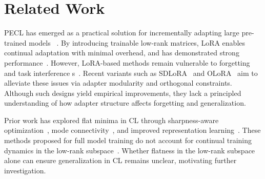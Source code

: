 \documentclass[10pt]{article} %
\newcommand{\minisection}[1]{\vspace{0.04in}\noindent{\bf #1}}
\begin{document}
\section{Related Work}

\minisection{LoRA-Based CL.}
PECL has emerged as a practical solution for incrementally adapting large pre-trained models
~\cite{pmlr-v97-houlsby19a,Wang_2022_CVPR,dingParameterefficientFinetuningLargescale2023,xu2023parameterefficientfinetuningmethodspretrained}. By introducing trainable low-rank matrices, LoRA enables continual adaptation with minimal overhead, and has demonstrated strong performance~\cite{hu2022lora}.
However, LoRA-based methods remain vulnerable to forgetting and task interference
s~\cite{Gao_2023_ICCV,10.1145/3730436.3730456,yang2024parametercollisionhinderingcontinual}. 
Recent variants such as SDLoRA~\cite{wu2025sdlorascalabledecoupledlowrank} and OLoRA~\cite{NEURIPS2020_70d85f35,wang2023orthogonal} aim to alleviate these issues via adapter modularity and orthogonal constraints. 
Although such designs yield empirical improvements, they lack a principled understanding of how adapter structure affects forgetting and generalization.

\minisection{Flat Minima.}
Prior work has explored flat minima in CL through sharpness-aware optimization~\cite{pmlr-v151-bisla22a,Zhang_GAM,NEURIPS2024_C-Flat,yangRevisitingFlatnessAwareOptimization2025,chen2026sharpnessflatnessdecompositionframework}, mode connectivity~\cite{izmailov2019averagingweightsleadswider,mirzadeh2020linearmodeconnectivitymultitask}, and improved representation learning~\cite{hu2022doesselfsupervisedpretrainingperform,ramasesh2022effect}.
These methods proposed for full model training do not account for continual training dynamics in the low-rank subspace~\cite{yangRevisitingFlatnessAwareOptimization2025}. Whether flatness in the low-rank subspace alone can ensure generalization in CL remains unclear, motivating further investigation.
\end{document}
